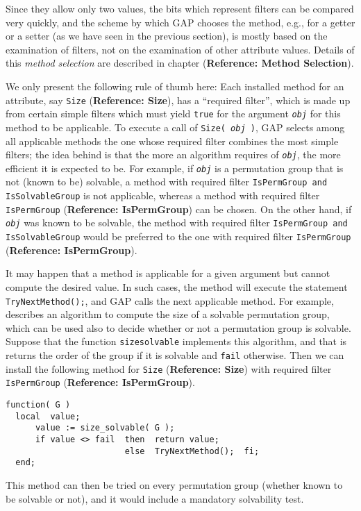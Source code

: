 \documentclass[a4paper,11pt]{report}
\begin{document}
{{ Since they allow only two values, the bits which represent filters can be
compared very quickly, and the scheme by which \textsf{GAP} chooses the method, e.g., for a getter or a setter (as we have seen in the
previous section), is mostly based on the examination of filters, not on the
examination of other attribute values. Details of this \emph{method selection} are described in chapter{\nobreakspace} (\textbf{Reference: Method Selection}). 

 We only present the following rule of thumb here: Each installed method for an
attribute, say \texttt{Size} (\textbf{Reference: Size}), has a ``required filter'', which is made up from certain simple filters which must yield \texttt{true} for the argument \mbox{\texttt{\mdseries\slshape obj}} for this method to be applicable. To execute a call of \texttt{Size( \mbox{\texttt{\mdseries\slshape obj}} )}, \textsf{GAP} selects among all applicable methods the one whose required filter combines
the most simple filters; the idea behind is that the more an algorithm
requires of \mbox{\texttt{\mdseries\slshape obj}}, the more efficient it is expected to be. For example, if \mbox{\texttt{\mdseries\slshape obj}} is a permutation group that is not (known to be) solvable, a method with
required filter \texttt{IsPermGroup and IsSolvableGroup} is not applicable, whereas a method with required filter \texttt{IsPermGroup} (\textbf{Reference: IsPermGroup}) can be chosen. On the other hand, if \mbox{\texttt{\mdseries\slshape obj}} was known to be solvable, the method with required filter \texttt{IsPermGroup and IsSolvableGroup} would be preferred to the one with required filter \texttt{IsPermGroup} (\textbf{Reference: IsPermGroup}). 

 It may happen that a method is applicable for a given argument but cannot
compute the desired value. In such cases, the method will execute the
statement \texttt{TryNextMethod();},  and \textsf{GAP} calls the next applicable method. For example, \cite{Sims90b} describes an algorithm to compute the size of a solvable permutation group,
which can be used also to decide whether or not a permutation group is
solvable. Suppose that the function \texttt{size{\textunderscore}solvable} implements this algorithm, and that is returns the order of the group if it is
solvable and \texttt{fail} otherwise. Then we can install the following method for \texttt{Size} (\textbf{Reference: Size}) with required filter \texttt{IsPermGroup} (\textbf{Reference: IsPermGroup}). 
\begin{Verbatim}[commandchars=!@|,fontsize=\small,frame=single,label=Example]
  function( G )
  local  value;
      value := size_solvable( G );
      if value <> fail  then  return value;
                        else  TryNextMethod();  fi;
  end;
\end{Verbatim}
 This method can then be tried on every permutation group (whether known to be
solvable or not), and it would include a mandatory solvability test. 

}}
\end{document}
